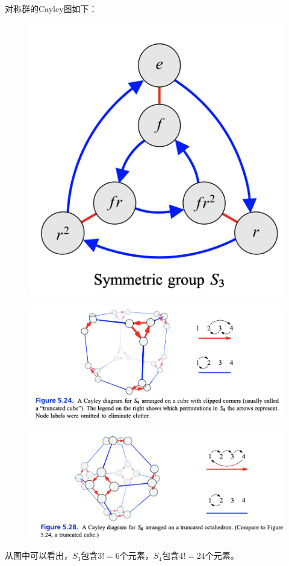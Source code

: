 \documentclass[12pt]{article}
\begin{document}
对称群的Cayley图如下：
\begin{figure}[H]
    \centering
    \includegraphics[width=.3\textwidth]{fig/Group/Cayley-S3.png}
\end{figure}
\begin{figure}[H]
    \centering
    \includegraphics[width=1\textwidth]{fig/Group/Cayley-S4.png}
\end{figure}
\begin{figure}[H]
    \centering
    \includegraphics[width=1\textwidth]{fig/Group/Cayley-S4-Octahedron.png}
\end{figure}
从图中可以看出，$S_3$包含$3!=6$个元素，$S_4$包含$4!=24$个元素。
\end{document}
